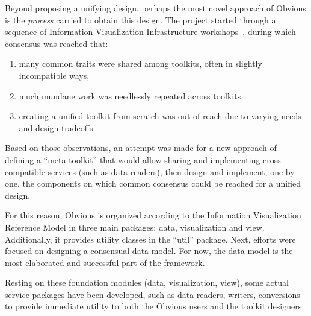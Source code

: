 Beyond proposing a unifying design, perhaps the most novel approach of
Obvious is the \emph{process} carried to obtain this design.  The
project started through a sequence of Information Visualization
Infrastructure workshops~\cite{visinfrastructure1, visinfrastructure2,
vismaster2008}, during which consensus was reached that:

\begin{enumerate}[noitemsep]
\item many common traits were shared among toolkits, often in slightly
  incompatible ways,
\item much mundane work was needlessly repeated across toolkits,
\item creating a unified toolkit from scratch was out of reach due to
  varying needs and design tradeoffs.
\end{enumerate}

Based on those observations, an attempt was made for a new approach of
defining a ``meta-toolkit'' that would allow sharing and implementing
cross-compatible services (such as data readers), then design and
implement, one by one, the components on which common consensus could
be reached for a unified design.

For this reason, Obvious is organized according to the Information
Visualization Reference Model in three main packages: data,
visualization and view. Additionally, it provides utility classes in
the ``util'' package.  Next, efforts were focused on designing a
consensual data model. For now, the data model is the most elaborated
and successful part of the framework.  

Resting on these foundation modules (data, visualization, view), some
actual service packages have been developed, such as data readers,
writers, conversions to provide immediate utility to both the Obvious
users and the toolkit designers.

